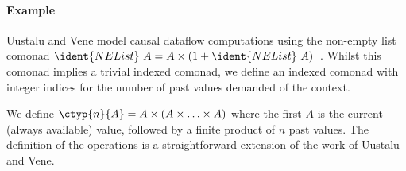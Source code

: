 \paragraph{Example}
Uustalu and Vene model causal dataflow computations using the
non-empty list comonad $\ident{NEList}~A = A \times (1 +
\ident{NEList}~A)$~\cite{comonads-notions}.  Whilst this comonad
implies a trivial indexed comonad, we define an indexed comonad with
integer indices for the number of past values demanded of the context.

We define $\ctyp{n}{A} = A \times (A \times \ldots \times A)$ where the first $A$ is the current
(always available) value, followed by a finite product of $n$ past values. The definition of the
operations is a straightforward extension of the work of Uustalu and Vene.


